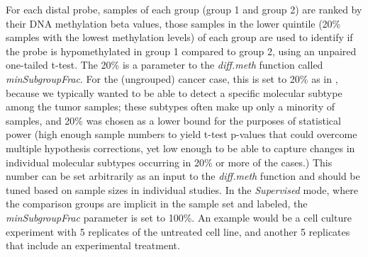 For each distal probe, samples of each group (group 1 and group 2) are ranked by their DNA methylation beta values, those samples in the lower quintile (20\% samples with the lowest methylation levels) of each group are used to identify if the probe is hypomethylated in group 1 compared to group 2, using an unpaired one-tailed t-test. The 20\% is a parameter to the \textit{diff.meth} function called \textit{minSubgroupFrac}. For the (ungrouped) cancer case, this is set to 20\% as in , because we typically wanted to be able to detect a specific molecular subtype among the tumor samples; these subtypes often make up only a minority of samples, and 20\% was chosen as a lower bound for the purposes of statistical power (high enough sample numbers to yield t-test p-values that could overcome multiple hypothesis corrections, yet low enough to be able to capture changes in individual molecular subtypes occurring in 20\% or more of the cases.) This number can be set arbitrarily as an input to the \textit{diff.meth} function and should be tuned based on sample sizes in individual studies. In the \textit{Supervised} mode, where the comparison groups are implicit in the sample set and labeled, the \textit{minSubgroupFrac} parameter is set to 100\%.  An example would be a cell culture experiment with 5 replicates of the untreated cell line, and another 5 replicates that include an experimental treatment.
% 
% 
% 
%
% 
% 
% 
%
% 
%

